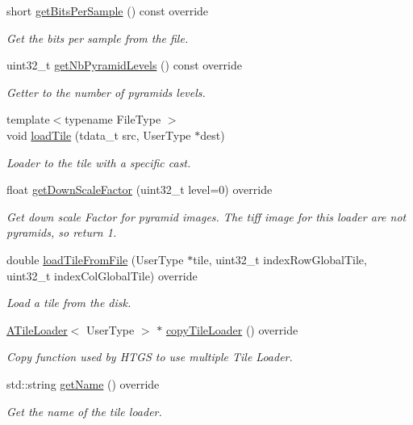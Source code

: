 \begin{DoxyCompactItemize}
short \hyperlink{classfi_1_1GrayscaleTiffTileLoader_a80ae5ca350571d2c993a68d40bdc39c9}{get\+Bits\+Per\+Sample} () const override
\begin{DoxyCompactList}\small\item\em Get the bits per sample from the file. \end{DoxyCompactList}\item 
uint32\+\_\+t \hyperlink{classfi_1_1GrayscaleTiffTileLoader_a3a915d36a8c88a687b04ee8d5a15ecb0}{get\+Nb\+Pyramid\+Levels} () const override
\begin{DoxyCompactList}\small\item\em Getter to the number of pyramids levels. \end{DoxyCompactList}\item 
{\footnotesize template$<$typename File\+Type $>$ }\\void \hyperlink{classfi_1_1GrayscaleTiffTileLoader_aeaea60046a454f93741526f9c2aa51f7}{load\+Tile} (tdata\+\_\+t src, User\+Type $\ast$dest)
\begin{DoxyCompactList}\small\item\em Loader to the tile with a specific cast. \end{DoxyCompactList}\item 
float \hyperlink{classfi_1_1GrayscaleTiffTileLoader_a30200666aa71f80ea0fa9e035519635b}{get\+Down\+Scale\+Factor} (uint32\+\_\+t level=0) override
\begin{DoxyCompactList}\small\item\em Get down scale Factor for pyramid images. The tiff image for this loader are not pyramids, so return 1. \end{DoxyCompactList}\item 
double \hyperlink{classfi_1_1GrayscaleTiffTileLoader_af52ec5177c51882b9544ee9684f7a2ae}{load\+Tile\+From\+File} (User\+Type $\ast$tile, uint32\+\_\+t index\+Row\+Global\+Tile, uint32\+\_\+t index\+Col\+Global\+Tile) override
\begin{DoxyCompactList}\small\item\em Load a tile from the disk. \end{DoxyCompactList}\item 
\hyperlink{classfi_1_1ATileLoader}{A\+Tile\+Loader}$<$ User\+Type $>$ $\ast$ \hyperlink{classfi_1_1GrayscaleTiffTileLoader_a57eb82e8bcdf71d2cd5f16f93bbe24a4}{copy\+Tile\+Loader} () override
\begin{DoxyCompactList}\small\item\em Copy function used by H\+T\+GS to use multiple Tile Loader. \end{DoxyCompactList}\item 
std\+::string \hyperlink{classfi_1_1GrayscaleTiffTileLoader_a66be68fc0c11aefbcb141ddb8c9e4deb}{get\+Name} () override
\begin{DoxyCompactList}\small\item\em Get the name of the tile loader. \end{DoxyCompactList}\end{DoxyCompactItemize}
